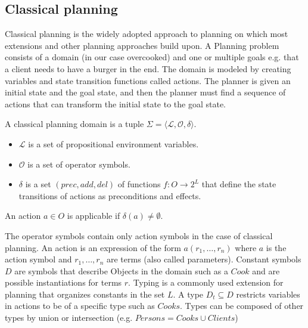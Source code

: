 
\subsection{Classical planning}\label{sec:classical-planning}

Classical planning is the widely adopted approach to planning on which most extensions and other planning approaches build upon.
A Planning problem consists of a domain (in our case overcooked) and one or multiple goals e.g. that a client needs to have a burger in the end.
The domain is modeled by creating variables and state transition functions called actions.
The planner is given an initial state and the goal state, and then the planner must find a sequence of actions that can transform the initial state to the goal state.

\begin{definition}
  A classical planning domain is a tuple $\Sigma=\langle \mathcal{L}, \mathcal{O}, \delta \rangle$.
  \begin{itemize}
    \item $\mathcal{L}$ is a set of propositional environment variables. 
    \item $\mathcal{O}$ is a set of operator symbols.
    \item $\delta$ is a set $(prec, add, del )$ of functions $f: O \rightarrow 2^L$ that define the state transitions of actions as preconditions and effects.
  \end{itemize}
  An action $a \in O$ is applicable if $\delta(a) \neq \emptyset$.
\end{definition}

The operator symbols contain only action symbols in the case of classical planning.
An action is an expression of the form $a(r_1,\dots,r_n)$ where $a$ is the action symbol and $r_1,\dots,r_n$ are terms (also called parameters).
Constant symbols $D$ are symbols that describe Objects in the domain such as a $Cook$ and are possible instantiations for terms $r$.
Typing is a commonly used extension for planning that organizes constants in the set $L$.
A type $D_t \subseteq D$ restricts variables in actions to be of a specific type such as $Cooks$.
Types can be composed of other types by union or intersection (e.g. $Persons=Cooks\cup Clients$)

